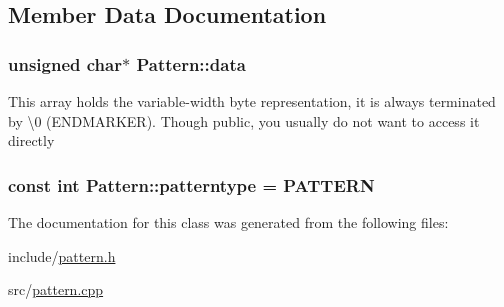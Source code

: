 \subsection{Member Data Documentation}
\hypertarget{classPattern_a2e20f4d132daff981db27bb13d3ff2b5}{}
\subsubsection[{data}]{\setlength{\rightskip}{0pt plus 5cm}unsigned char$\ast$ Pattern\+::data}\label{classPattern_a2e20f4d132daff981db27bb13d3ff2b5}
This array holds the variable-\/width byte representation, it is always terminated by \textbackslash{}0 (E\+N\+D\+M\+A\+R\+K\+E\+R). Though public, you usually do not want to access it directly \hypertarget{classPattern_ab48e128327c90c9c250a6b0d7e8362a3}{}
\subsubsection[{patterntype}]{\setlength{\rightskip}{0pt plus 5cm}const int Pattern\+::patterntype = {\bf P\+A\+T\+T\+E\+R\+N}\hspace{0.3cm}{\ttfamily [static]}}\label{classPattern_ab48e128327c90c9c250a6b0d7e8362a3}


The documentation for this class was generated from the following files\+:\begin{DoxyCompactItemize}
\item 
include/\hyperlink{pattern_8h}{pattern.\+h}\item 
src/\hyperlink{pattern_8cpp}{pattern.\+cpp}\end{DoxyCompactItemize}
